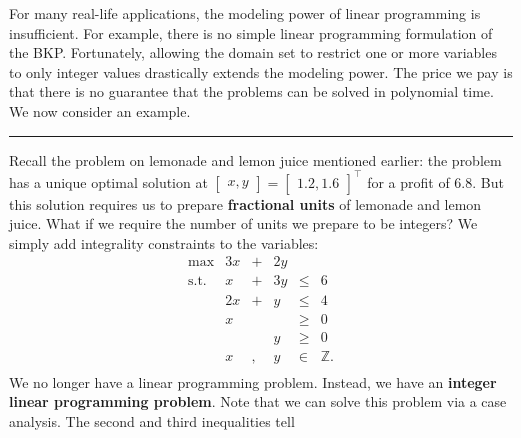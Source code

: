 For many real-life applications, the modeling power of linear
programming is insufficient. For example, there is no simple linear
programming formulation of the BKP. Fortunately,
allowing the domain set to restrict one or more variables to only
integer values drastically extends the modeling power. The price we pay
is that there is no guarantee that the problems can be solved in
polynomial time. We now consider an example.
\begin{center}\rule{0.5\linewidth}{.4pt}\end{center}
Recall the problem on lemonade and lemon juice mentioned earlier: the problem has a unique optimal solution at
\(\begin{bmatrix} x,y\end{bmatrix} = \begin{bmatrix} 1.2 , 1.6\end{bmatrix}^{\!\top}\)
for a profit of \(6.8\). But this solution requires us to prepare
\textbf{fractional units} of lemonade and lemon juice. What if we require the
number of units we prepare to be integers? We simply add integrality
constraints to the variables: \[\begin{array}{rrcrll}
\max & 3x & + & 2y & \\
\text{s.t.} 
& x & + & 3y & \leq & 6 \\
& 2x & +&  y & \leq & 4 \\
& x &  & & \geq & 0 \\
& & & y & \geq & 0 \\
& x &,& y & \in  & \mathbb{Z}. \\
\end{array}\] We no longer have a linear programming problem. Instead,
we have an \textbf{integer linear programming problem}. Note that we can solve
this problem via a case analysis. The second and third inequalities tell
